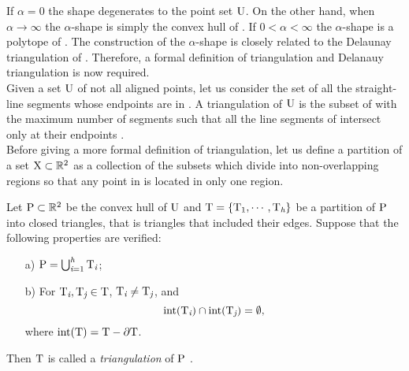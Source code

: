 If $\alpha = 0$ the shape degenerates to the point set $\mbox{$\textup{U}$}$. On the other hand, when $\alpha\rightarrow\infty$ the $\alpha$-shape is simply the convex hull of . If $0<\alpha<\infty$ the $\alpha$-shape is a polytope of  \cite{edelsbrunner1994three}. The construction of the $\alpha$-shape is closely related to the Delaunay triangulation of  \cite{mucke1993shapes}. Therefore, a formal definition of triangulation and Delanauy triangulation is now required. \\ \indent
Given a set $\mbox{$\textup{U}$}$ of not all aligned points, let us consider the set  of all the straight-line segments whose endpoints are in . 
A triangulation  of $\mbox{$\textup{U}$}$ is the subset of  with the maximum number of segments such that all the line segments of  intersect only at their endpoints \cite{lloyd1977triangulations}. 
\\ \indent Before giving a more formal definition of triangulation, let us define a partition of a set $\mbox{$\textup{X}$}\subset \mathbb{R}^2$ as a collection of the subsets which divide  into non-overlapping regions so that any point in  is located in only one region. 
\begin{definition} \indent Let $\mbox{$\textup{P}$}\subset \mathbb{R}^2$ be the convex hull of $\mbox{$\textup{U}$}$ and $\mbox{$\textup{T}$} = \{\mbox{$\textup{T}$}_1, \cdots, \mbox{$\textup{T}$}_{\textit{h}}\}$ be a partition of $\mbox{$\textup{P}$}$ into closed triangles, that is triangles that included their edges. Suppose that the following properties are verified:
\begin{itemize}
\item[a)] $\mbox{$\textup{P}$} = \bigcup_{\textit{i} = 1}^{\textit{h}}\mbox{$\textup{T}$}_{\textit{i}}$;
\item[b)] For $\mbox{$\textup{T}$}_{\textit{i}}, \mbox{$\textup{T}$}_{\textit{j}} \in \mbox{$\textup{T}$}$, $\mbox{$\textup{T}$}_{\textit{i}} \neq \mbox{$\textup{T}$}_{\textit{j}}$, and 
\begin{equation*}
\textrm{int}(\mbox{$\textup{T}$}_{\textit{i}})\cap \textrm{int}(\mbox{$\textup{T}$}_{\textit{j}}) = \emptyset,
\end{equation*}
where $\textrm{int}(\mbox{$\textup{T}$}) = \mbox{$\textup{T}$}-\partial \mbox{$\textup{T}$}$.
\end{itemize}
Then $\mbox{$\textup{T}$}$ is called a \textit{triangulation} of $\mbox{$\textup{P}$}$ \cite{Numericalmethods}.
\end{definition}
